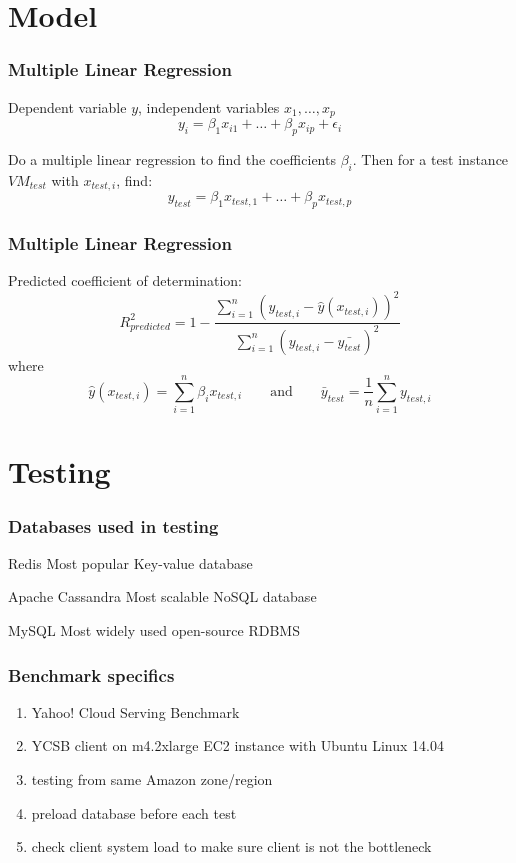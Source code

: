 \documentclass{beamer}
\begin{document}
\section{Model}
\begin{frame}
\frametitle{Multiple Linear Regression}
Dependent variable $y$, independent variables $x_1,\ldots,x_p$
\begin{displaymath}{
y_i = \beta_1 x_{i1}+\ldots+\beta_{p}x_{ip}+\epsilon_i
}\end{displaymath}

Do a multiple linear regression to find the coefficients $\beta_i$.  Then for a test instance $VM_{test}$ with $x_{test,i}$, find:
\begin{displaymath}{
y_{test} = \beta_1 x_{test,1}+\ldots+\beta_{p}x_{test,p}
}\end{displaymath}

\end{frame}

\begin{frame}
\frametitle{Multiple Linear Regression}
Predicted coefficient of determination:
\begin{displaymath}
R_{predicted}^2=1-\frac{\sum_{i=1}^{n} (y_{test,i} - \hat{y}(x_{test,i}))^{2}}{\sum_{i=1}^{n} (y_{test,i} - \bar{y_{test}})^{2}}
\end{displaymath}
where
\begin{displaymath}
\hat{y}(x_{test,i})=\sum_{i=1}^{n} \beta_i x_{test,i}
\qquad\text{and}\qquad
\bar{y}_{test}=\frac{1}{n}\sum_{i=1}^{n} y_{test,i}
\end{displaymath}
\end{frame}
\section{Testing}

\begin{frame}
\frametitle{Databases used in testing}
\begin{block}{Redis}
Most popular Key-value database
\end{block}
\begin{block}{Apache Cassandra}
Most scalable NoSQL database
\end{block}
\begin{block}{MySQL}
Most widely used open-source RDBMS
\end{block}
\end{frame}

\begin{frame}
\frametitle{Benchmark specifics}
\begin{enumerate}
\item Yahoo! Cloud Serving Benchmark 
\item YCSB client on m4.2xlarge EC2 instance with Ubuntu Linux 14.04
\item testing from same Amazon zone/region
\item preload database before each test
\item check client system load to make sure client is not the bottleneck
\end{enumerate}
\end{frame}
\end{document}
